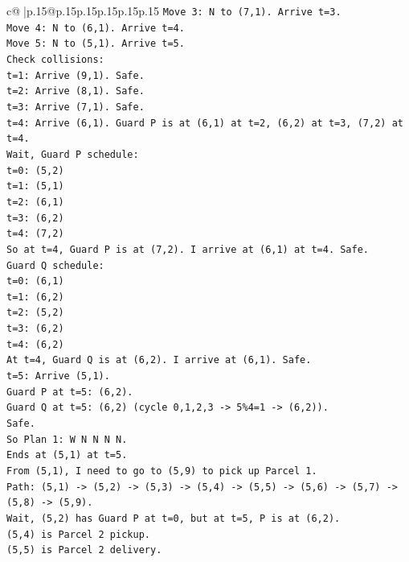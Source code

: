 \documentclass{article}
\begin{document}
{\begin{supertabular}{c@{$\;$}|p{.15\linewidth}@{}p{.15\linewidth}p{.15\linewidth}p{.15\linewidth}p{.15\linewidth}p{.15\linewidth}}
{{{\texttt{Move 3: N to (7,1). Arrive t=3.} \\
\texttt{Move 4: N to (6,1). Arrive t=4.} \\
\texttt{Move 5: N to (5,1). Arrive t=5.} \\
\texttt{Check collisions:} \\
\texttt{t=1: Arrive (9,1). Safe.} \\
\texttt{t=2: Arrive (8,1). Safe.} \\
\texttt{t=3: Arrive (7,1). Safe.} \\
\texttt{t=4: Arrive (6,1). Guard P is at (6,1) at t=2, (6,2) at t=3, (7,2) at t=4.} \\
\texttt{Wait, Guard P schedule:} \\
\texttt{t=0: (5,2)} \\
\texttt{t=1: (5,1)} \\
\texttt{t=2: (6,1)} \\
\texttt{t=3: (6,2)} \\
\texttt{t=4: (7,2)} \\
\texttt{So at t=4, Guard P is at (7,2). I arrive at (6,1) at t=4. Safe.} \\
\texttt{Guard Q schedule:} \\
\texttt{t=0: (6,1)} \\
\texttt{t=1: (6,2)} \\
\texttt{t=2: (5,2)} \\
\texttt{t=3: (6,2)} \\
\texttt{t=4: (6,2)} \\
\texttt{At t=4, Guard Q is at (6,2). I arrive at (6,1). Safe.} \\
\texttt{t=5: Arrive (5,1).} \\
\texttt{Guard P at t=5: (6,2).} \\
\texttt{Guard Q at t=5: (6,2) (cycle 0,1,2,3 {-}> 5\%4=1 {-}> (6,2)).} \\
\texttt{Safe.} \\
\texttt{So Plan 1: W N N N N.} \\
\texttt{Ends at (5,1) at t=5.} \\
\texttt{From (5,1), I need to go to (5,9) to pick up Parcel 1.} \\
\texttt{Path: (5,1) {-}> (5,2) {-}> (5,3) {-}> (5,4) {-}> (5,5) {-}> (5,6) {-}> (5,7) {-}> (5,8) {-}> (5,9).} \\
\texttt{Wait, (5,2) has Guard P at t=0, but at t=5, P is at (6,2).} \\
\texttt{(5,4) is Parcel 2 pickup.} \\
\texttt{(5,5) is Parcel 2 delivery.} \\
}}}
\end{supertabular}}
\end{document}
